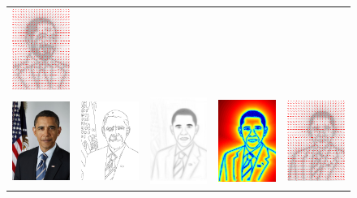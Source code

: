 \begin{figure}
\begin{tabular}{ccccc}
\includegraphics[width=1in]     {figures/imagetable/dir_rd.png} \\
\includegraphics[width=1in]{figures/imagetable/image_bo.png} &
\includegraphics[width=1in]{figures/imagetable/edges_bo.png} &
\includegraphics[width=1in]    {figures/imagetable/avg_bo.png} &
\includegraphics[width=1in]   {figures/imagetable/mag_bo.png} &
\includegraphics[width=1in]     {figures/imagetable/dir_bo.png}
\end{tabular}
\end{figure}
